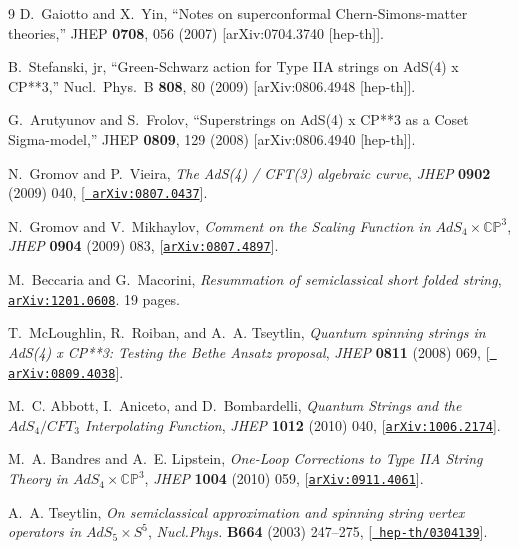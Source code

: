 \documentclass[a4paper,11pt]{article}
\numberwithin{equation}{section}
\begin{document}
\begin{thebibliography} {9}
D.~Gaiotto and X.~Yin,
  ``Notes on superconformal Chern-Simons-matter theories,''
  JHEP {\bf 0708}, 056 (2007)
  [arXiv:0704.3740 [hep-th]]. 

  B.~Stefanski, jr,
  ``Green-Schwarz action for Type IIA strings on AdS(4) x CP**3,''
  Nucl.\ Phys.\ B {\bf 808}, 80 (2009)
  [arXiv:0806.4948 [hep-th]].

  G.~Arutyunov and S.~Frolov,
  ``Superstrings on AdS(4) x CP**3 as a Coset Sigma-model,''
  JHEP {\bf 0809}, 129 (2008)
  [arXiv:0806.4940 [hep-th]].

N.~Gromov and P.~Vieira, {\it {The AdS(4) / CFT(3) algebraic curve}},  {\em
  JHEP} {\bf 0902} (2009) 040, [\href{http://xxx.lanl.gov/abs/0807.0437}{{\tt
  arXiv:0807.0437}}].

N.~Gromov and V.~Mikhaylov, {\it {Comment on the Scaling Function in
  $AdS_{4}\times \mathbb{CP}^{3}$}},  {\em JHEP} {\bf 0904} (2009) 083,
  [\href{http://xxx.lanl.gov/abs/0807.4897}{{\tt arXiv:0807.4897}}].

M.~Beccaria and G.~Macorini, {\it {Resummation of semiclassical short folded
  string}},  \href{http://xxx.lanl.gov/abs/1201.0608}{{\tt arXiv:1201.0608}}.
  19 pages.

T.~McLoughlin, R.~Roiban, and A.~A. Tseytlin, {\it {Quantum spinning strings in
  AdS(4) x CP**3: Testing the Bethe Ansatz proposal}},  {\em JHEP} {\bf 0811}
  (2008) 069, [\href{http://xxx.lanl.gov/abs/0809.4038}{{\tt
  arXiv:0809.4038}}].

M.~C. Abbott, I.~Aniceto, and D.~Bombardelli, {\it {Quantum Strings and the
  $AdS_4/CFT_3$ Interpolating Function}},  {\em JHEP} {\bf 1012} (2010) 040,
  [\href{http://xxx.lanl.gov/abs/1006.2174}{{\tt arXiv:1006.2174}}].

M.~A. Bandres and A.~E. Lipstein, {\it {One-Loop Corrections to Type IIA String
  Theory in $AdS_{4}\times\mathbb{CP}^{3}$}},  {\em JHEP} {\bf 1004} (2010)
  059, [\href{http://xxx.lanl.gov/abs/0911.4061}{{\tt arXiv:0911.4061}}].

A.~A. Tseytlin, {\it {On semiclassical approximation and spinning string vertex
  operators in $AdS_{5}\times S^{5}$}},  {\em Nucl.Phys.} {\bf B664} (2003)
  247--275, [\href{http://xxx.lanl.gov/abs/hep-th/0304139}{{\tt
  hep-th/0304139}}].


\end{thebibliography}
\end{document}
